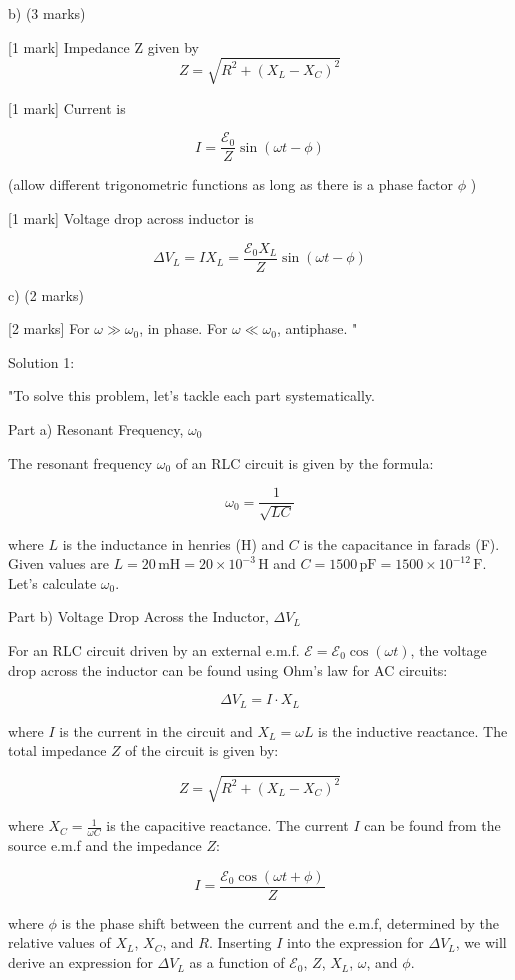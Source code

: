 b) (3 marks)

[1 mark] Impedance Z given by 
\[ Z = \sqrt{R^2 + (X_L - X_C)^2} \]

[1 mark] Current is

\[ I =  \frac{\mathcal{E}_0}{Z} \sin(\omega t - \phi) \]

(allow different trigonometric functions as long as there is a phase factor \( \phi \) ) 

[1 mark] Voltage drop across inductor is 

\[ \Delta{V_L} = I X_L = \frac{\mathcal{E}_0 X_L}{Z} \sin(\omega t - \phi) \]

c) (2 marks)

[2 marks] For \( \omega \gg \omega_{0} \), in phase. For \( \omega \ll \omega_{0} \), antiphase. "

Solution 1:

"To solve this problem, let's tackle each part systematically.

Part a) Resonant Frequency, \( \omega_{0} \)

The resonant frequency \(\omega_{0}\) of an RLC circuit is given by the formula:

\[ \omega_{0} = \frac{1}{\sqrt{LC}} \]

where \(L\) is the inductance in henries (H) and \(C\) is the capacitance in farads (F). Given values are \(L = 20 \, \text{mH} = 20 \times 10^{-3} \, \text{H}\) and \(C = 1500 \, \text{pF} = 1500 \times 10^{-12} \, \text{F}\). Let's calculate \(\omega_{0}\).

Part b) Voltage Drop Across the Inductor, \( \Delta V_{L} \)

For an RLC circuit driven by an external e.m.f. \(\mathcal{E} = \mathcal{E}_{0} \cos(\omega t)\), the voltage drop across the inductor can be found using Ohm's law for AC circuits:

\[ \Delta V_{L} = I \cdot X_{L} \]

where \(I\) is the current in the circuit and \(X_{L} = \omega L\) is the inductive reactance. The total impedance \(Z\) of the circuit is given by:

\[ Z = \sqrt{R^2 + (X_{L} - X_{C})^2} \]

where \(X_{C} = \frac{1}{\omega C}\) is the capacitive reactance. The current \(I\) can be found from the source e.m.f and the impedance \(Z\):

\[ I = \frac{\mathcal{E}_{0} \cos(\omega t + \phi)}{Z} \]

where \(\phi\) is the phase shift between the current and the e.m.f, determined by the relative values of \(X_{L}\), \(X_{C}\), and \(R\). Inserting \(I\) into the expression for \(\Delta V_{L}\), we will derive an expression for \(\Delta V_{L}\) as a function of \(\mathcal{E}_{0}\), \(Z\), \(X_{L}\), \(\omega\), and \(\phi\).


